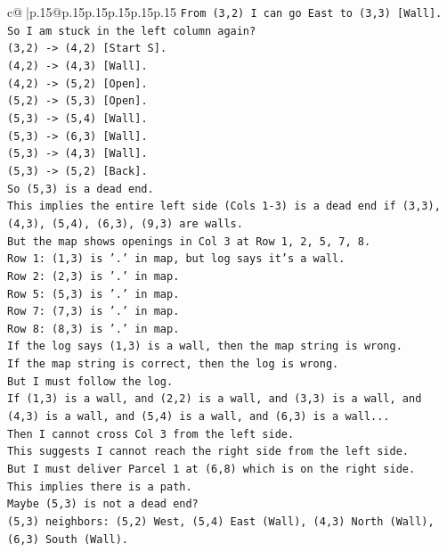 \documentclass{article}
\begin{document}
{\begin{supertabular}{c@{$\;$}|p{.15\linewidth}@{}p{.15\linewidth}p{.15\linewidth}p{.15\linewidth}p{.15\linewidth}p{.15\linewidth}}
{{{\texttt{From (3,2) I can go East to (3,3) {[}Wall{]}.} \\
\texttt{So I am stuck in the left column again?} \\
\texttt{(3,2) {-}> (4,2) {[}Start S{]}.} \\
\texttt{(4,2) {-}> (4,3) {[}Wall{]}.} \\
\texttt{(4,2) {-}> (5,2) {[}Open{]}.} \\
\texttt{(5,2) {-}> (5,3) {[}Open{]}.} \\
\texttt{(5,3) {-}> (5,4) {[}Wall{]}.} \\
\texttt{(5,3) {-}> (6,3) {[}Wall{]}.} \\
\texttt{(5,3) {-}> (4,3) {[}Wall{]}.} \\
\texttt{(5,3) {-}> (5,2) {[}Back{]}.} \\
\texttt{So (5,3) is a dead end.} \\
\texttt{This implies the entire left side (Cols 1{-}3) is a dead end if (3,3), (4,3), (5,4), (6,3), (9,3) are walls.} \\
\texttt{But the map shows openings in Col 3 at Row 1, 2, 5, 7, 8.} \\
\texttt{Row 1: (1,3) is '.' in map, but log says it's a wall.} \\
\texttt{Row 2: (2,3) is '.' in map.} \\
\texttt{Row 5: (5,3) is '.' in map.} \\
\texttt{Row 7: (7,3) is '.' in map.} \\
\texttt{Row 8: (8,3) is '.' in map.} \\
\texttt{If the log says (1,3) is a wall, then the map string is wrong.} \\
\texttt{If the map string is correct, then the log is wrong.} \\
\texttt{But I must follow the log.} \\
\texttt{If (1,3) is a wall, and (2,2) is a wall, and (3,3) is a wall, and (4,3) is a wall, and (5,4) is a wall, and (6,3) is a wall...} \\
\texttt{Then I cannot cross Col 3 from the left side.} \\
\texttt{This suggests I cannot reach the right side from the left side.} \\
\texttt{But I must deliver Parcel 1 at (6,8) which is on the right side.} \\
\texttt{This implies there is a path.} \\
\texttt{Maybe (5,3) is not a dead end?} \\
\texttt{(5,3) neighbors: (5,2) West, (5,4) East (Wall), (4,3) North (Wall), (6,3) South (Wall).} \\
}}}
\end{supertabular}}
\end{document}
